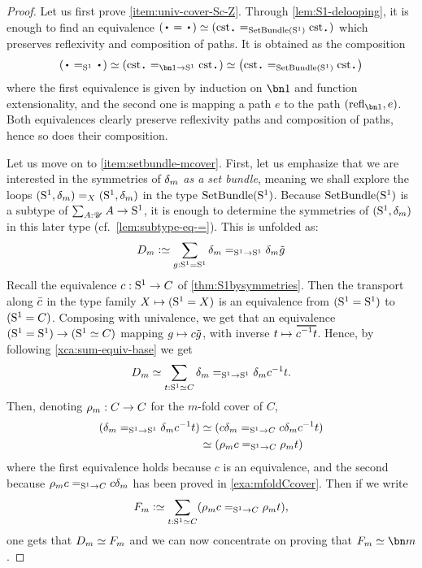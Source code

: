 \begin{proof}
  Let us first prove \ref{item:univ-cover-Sc-Z}. Through
  \cref{lem:S1-delooping}, it is enough to find an equivalence
  $(\base = \base) \weq (\cst\base =_{\SetBundle(\Sc)} \cst\base)$
  which preserves reflexivity and composition of paths. It is obtained
  as the composition
  \begin{displaymath}
    \left(\base =_{\Sc} \base\right) \weq \left( \cst\base=_{\bn 1\to \Sc}\cst\base \right)
    \weq \left( \cst\base =_{\SetBundle(\Sc)} \cst\base \right)
  \end{displaymath}
  where the first equivalence is given by induction on $\bn 1$ and
  function extensionality, and the second one is mapping a path $e$ to
  the path $(\refl{\bn 1}, e)$. Both equivalences clearly preserve
  reflexivity paths and composition of paths, hence so does their
  composition.

  Let us move on to \ref{item:setbundle-mcover}. %
  First, let us emphasize that we are interested in the symmetries of
  $\delta_{m}$ \emph{as a set bundle}, meaning we shall explore
  the loops $({\mathrm{S}^1},\delta_{m}) =_X ({\mathrm{S}^1},\delta_{m})$ in the type
  $\mathrm{SetBundle}({\mathrm{S}^1})$.
  Because $\mathrm{SetBundle}({\mathrm{S}^1})$ is a subtype of $\sum_{A:{\mathscr{U}}}A\to {\mathrm{S}^1}$, it
  is enough to determine the symmetries of $({\mathrm{S}^1},\delta_{m})$ in this later
  type (cf.\ \cref{lem:subtype-eq-=}). This is unfolded as:
  \begin{displaymath}
    D_m \defequi \sum_{g:\Sc = \Sc}\dg{m} =_{\Sc \to \Sc} \dg{m}\ptoe g
  \end{displaymath}
  Recall the equivalence $c: {\mathrm{S}^1} \to C$ of
  \cref{thm:S1bysymmetries}. Then the transport along $\bar {c}$ in the
  type family $X\mapsto ({\mathrm{S}^1}=X)$ is an equivalence from $({\mathrm{S}^1} = {\mathrm{S}^1})$
  to $({\mathrm{S}^1} = C)$. Composing with univalence, we get that an
  equivalence $({\mathrm{S}^1}={\mathrm{S}^1}) \to ({\mathrm{S}^1} \simeq C)$ mapping
  $g\mapsto c\tilde {g}$, with inverse
  $t \mapsto \overetop{\inv{c} t}$.
  Hence, by following \cref{xca:sum-equiv-base} we get
  \begin{displaymath}
    D_m \simeq  \sum_{t:{\mathrm{S}^1} \simeq C} \delta_{m} =_{{\mathrm{S}^1}\to {\mathrm{S}^1}} \delta_{m}c^{-1} t.
  \end{displaymath}
  Then, denoting $\rho_{m}: C \to C$ for the $m$-fold cover of $C$,
  \begin{displaymath}
    \begin{split}
      (\dg{m} =_{\Sc\to \Sc} \dg{m}\inv c t) %
      &\weq (c \dg{m} =_{\Sc\to C} c \dg{m} \inv c t)
      \\
      &\weq (\cdg{m}c =_{\Sc\to C} \cdg{m} t)
    \end{split}
  \end{displaymath}
  where the first equivalence holds because $c$ is an equivalence, and
  the second because $\rho_{m}c =_{{\mathrm{S}^1}\to C} c \delta_{m}$ has been
  proved in \cref{exa:mfoldCcover}.
  Then if we write
  \begin{displaymath}
    F_m \defequi \sum_{t:\Sc \weq C}(\cdg{m}c =_{\Sc\to C} \cdg{m} t),
  \end{displaymath}
  one gets that $D_m \simeq F_m$ and we can now concentrate on proving that
  $F_m \weq \bn m$.


\end{proof}
